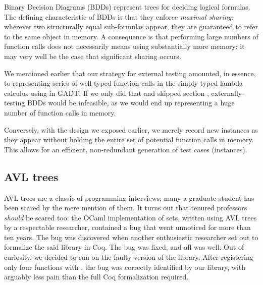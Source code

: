 Binary Decision Diagrams (BDDs) represent trees for deciding logical formulas. The
defining characteristic of BDDs is that they enforce \emph{maximal sharing}:
wherever two structurally equal sub-formulas appear, they are guaranteed to
refer to the same object in memory. A consequence is that performing large
numbers of function calls does not necessarily means using substantially more
memory: it may very well be the case that significant sharing occurs.

We mentioned earlier that our strategy for external testing amounted, in
essence, to representing series of well-typed function calls in the simply typed
lambda calculus using in GADT. If we only did that and skipped section
, externally-testing BDDs would be infeasible, as we
would end up representing a huge number of function calls in memory.

Conversely, with the design we exposed earlier, we merely record new instances
as they appear without holding the entire set of potential function calls in
memory. This allows for an efficient, non-redundant generation of test cases
(instances).

\subsection{AVL trees}

AVL trees are a classic of programming interviews; many a graduate
student has been scared by the mere mention of them. It turns out that
tenured professors \emph{should} be scared too: the OCaml
implementation of sets, written using AVL trees by a respectable
researcher, contained a bug that went unnoticed for more than ten
years. The bug was discovered when another enthusiastic researcher
set out to formalize the said library in Coq. The bug was fixed, and
all was well. Out of curiosity, we decided to run \arti on the faulty
version of the library.  After registering only four functions with
\arti, the bug was correctly identified by our library, with arguably
less pain than the full Coq formalization required.
